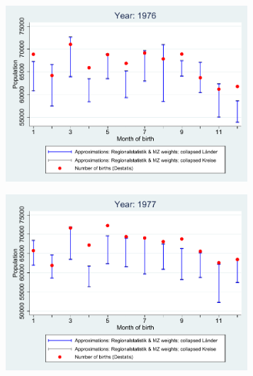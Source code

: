 \documentclass[a4paper ]{article}
\begin{document}
\begin{figure}[h]
\centering
\caption{Reform 1: 1976 - 1980}
\begin{subfigure}[t]{0.48\textwidth}
		\centering
		\includegraphics[width=0.99\textwidth]{comparison_population_1976.pdf}		
\end{subfigure}
\begin{subfigure}[t]{0.48\textwidth}
		\centering
		\includegraphics[width=0.99\textwidth]{comparison_population_1977.pdf}		
\end{subfigure}
\begin{subfigure}[t]{0.48\textwidth}
		\centering

\end{subfigure}
\end{figure}
\end{document}
